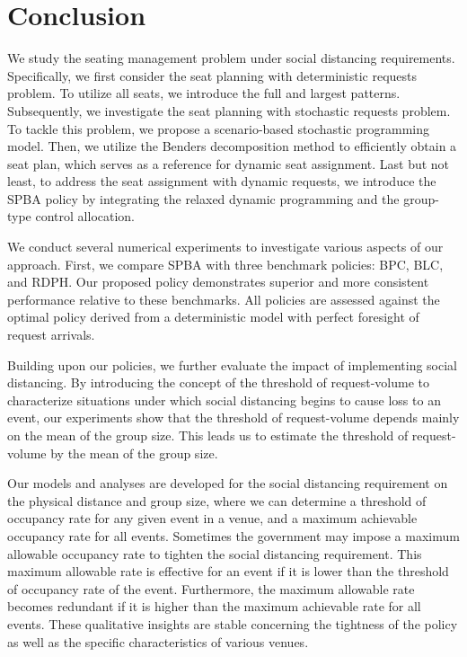 \section{Conclusion}\label{sec_conclusion}
We study the seating management problem under social distancing requirements. Specifically, we first consider the seat planning with deterministic requests problem. To utilize all seats, we introduce the full and largest patterns. Subsequently, we investigate the seat planning with stochastic requests problem. To tackle this problem, we propose a scenario-based stochastic programming model. Then, we utilize the Benders decomposition method to efficiently obtain a seat plan, which serves as a reference for dynamic seat assignment. Last but not least, to address the seat assignment with dynamic requests, we introduce the SPBA policy by integrating the relaxed dynamic programming and the group-type control allocation.

We conduct several numerical experiments to investigate various aspects of our approach. First, we compare SPBA with three benchmark policies: BPC, BLC, and RDPH. Our proposed policy demonstrates superior and more consistent performance relative to these benchmarks. All policies are assessed against the optimal policy derived from a deterministic model with perfect foresight of request arrivals.


Building upon our policies, we further evaluate the impact of implementing social distancing. By introducing the concept of the threshold of request-volume to characterize situations under which social distancing begins to cause loss to an event, our experiments show that the threshold of request-volume depends mainly on the mean of the group size. This leads us to estimate the threshold of request-volume by the mean of the group size.


Our models and analyses are developed for the social distancing requirement on the physical distance and group size, where we can determine a threshold of occupancy rate for any given event in a venue, and a maximum achievable occupancy rate for all events. Sometimes the government may impose a maximum allowable occupancy rate to tighten the social distancing requirement. This maximum allowable rate is effective for an event if it is lower than the threshold of occupancy rate of the event. Furthermore, the maximum allowable rate becomes redundant if it is higher than the maximum achievable rate for all events. These qualitative insights are stable concerning the tightness of the policy as well as the specific characteristics of various venues.


